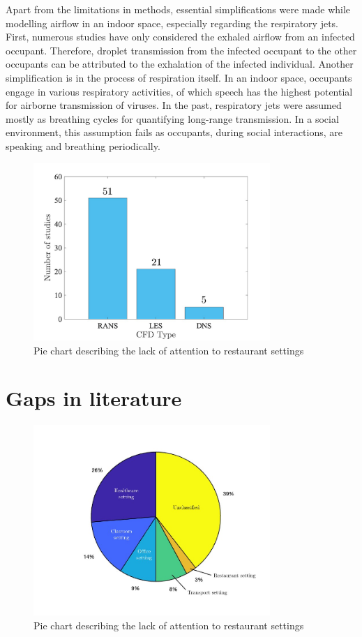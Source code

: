 \documentclass[preprint,12pt]{elsarticle}
\begin{document}
Apart from the limitations in methods, essential simplifications were made while modelling airflow in an indoor space, especially regarding the respiratory jets. First, numerous studies have only considered the exhaled airflow from an infected occupant. Therefore, droplet transmission from the infected occupant to the other occupants can be attributed to the exhalation of the infected individual. Another simplification is in the process of respiration itself. In an indoor space, occupants engage in various respiratory activities, of which speech has the highest potential for airborne transmission of viruses. In the past, respiratory jets were assumed mostly as breathing cycles for quantifying long-range transmission. In a social environment, this assumption fails as occupants, during social interactions, are speaking and breathing periodically.

\begin{figure}[ht]
    \centering
    \includegraphics[width=0.8\textwidth]{figures/cfd.jpg}
    \caption{Pie chart describing the lack of attention to restaurant settings}
    \label{fig:cfd}
\end{figure}

\section{Gaps in literature}

\begin{figure}[ht]
    \centering
    \includegraphics[width=0.8\textwidth]{figures/pie.jpg}
    \caption{Pie chart describing the lack of attention to restaurant settings}
    \label{fig:pie}
\end{figure}
\end{document}
